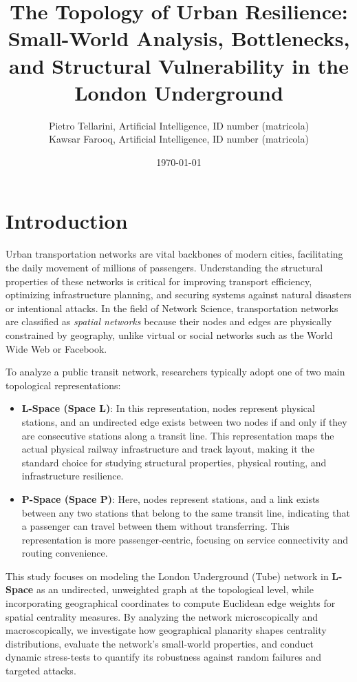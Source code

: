 \documentclass[12pt, a4paper]{article}
\author{Pietro Tellarini, Artificial Intelligence, ID number (matricola) \\ Kawsar Farooq, Artificial Intelligence, ID number (matricola)}
\date{\today}
\title{The Topology of Urban Resilience: Small-World Analysis, Bottlenecks, and Structural Vulnerability in the London Underground}
\begin{document}
\maketitle

\section{Introduction}
\label{introduction}
Urban transportation networks are vital backbones of modern cities, facilitating the daily movement of millions of passengers. Understanding the structural properties of these networks is critical for improving transport efficiency, optimizing infrastructure planning, and securing systems against natural disasters or intentional attacks. In the field of Network Science, transportation networks are classified as \textit{spatial networks} because their nodes and edges are physically constrained by geography, unlike virtual or social networks such as the World Wide Web or Facebook.

To analyze a public transit network, researchers typically adopt one of two main topological representations:
\begin{itemize}
    \item \textbf{L-Space (Space L)}: In this representation, nodes represent physical stations, and an undirected edge exists between two nodes if and only if they are consecutive stations along a transit line. This representation maps the actual physical railway infrastructure and track layout, making it the standard choice for studying structural properties, physical routing, and infrastructure resilience.
    \item \textbf{P-Space (Space P)}: Here, nodes represent stations, and a link exists between any two stations that belong to the same transit line, indicating that a passenger can travel between them without transferring. This representation is more passenger-centric, focusing on service connectivity and routing convenience.
\end{itemize}

This study focuses on modeling the London Underground (Tube) network in \textbf{L-Space} as an undirected, unweighted graph at the topological level, while incorporating geographical coordinates to compute Euclidean edge weights for spatial centrality measures. By analyzing the network microscopically and macroscopically, we investigate how geographical planarity shapes centrality distributions, evaluate the network's small-world properties, and conduct dynamic stress-tests to quantify its robustness against random failures and targeted attacks.
\end{document}
